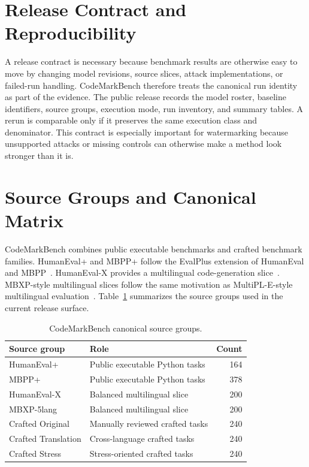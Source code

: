 \section{Release Contract and Reproducibility}

A release contract is necessary because benchmark results are otherwise easy to move by changing model revisions, source slices, attack implementations, or failed-run handling. CodeMarkBench therefore treats the canonical run identity as part of the evidence. The public release records the model roster, baseline identifiers, source groups, execution mode, run inventory, and summary tables. A rerun is comparable only if it preserves the same execution class and denominator. This contract is especially important for watermarking because unsupported attacks or missing controls can otherwise make a method look stronger than it is.

\section{Source Groups and Canonical Matrix}

CodeMarkBench combines public executable benchmarks and crafted benchmark families. HumanEval+ and MBPP+ follow the EvalPlus extension of HumanEval and MBPP~\cite{liu2023evalplus}. HumanEval-X provides a multilingual code-generation slice~\cite{zheng2023codegeex}. MBXP-style multilingual slices follow the same motivation as MultiPL-E-style multilingual evaluation~\cite{cassano2022multiple}. Table~\ref{tab:codemarkbench-sources} summarizes the source groups used in the current release surface.

\begin{table}[htbp]
\centering
\caption{CodeMarkBench canonical source groups.}
\label{tab:codemarkbench-sources}
\compacttable
\begin{tabular}{@{}llr@{}}
\toprule
Source group & Role & Count \\
\midrule
HumanEval+ & Public executable Python tasks & 164 \\
MBPP+ & Public executable Python tasks & 378 \\
HumanEval-X & Balanced multilingual slice & 200 \\
MBXP-5lang & Balanced multilingual slice & 200 \\
Crafted Original & Manually reviewed crafted tasks & 240 \\
Crafted Translation & Cross-language crafted tasks & 240 \\
Crafted Stress & Stress-oriented crafted tasks & 240 \\
\bottomrule
\end{tabular}
\end{table}

